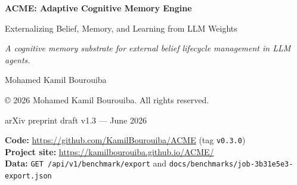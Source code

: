 \documentclass[11pt,a4paper]{article}
\newcommand{\papertagline}{A cognitive memory substrate for external belief lifecycle management in LLM agents.}
\begin{document}



\begin{center}
  \vspace*{0.12in}
  {\sffamily\fontsize{24}{29}\selectfont\bfseries
   ACME: Adaptive Cognitive Memory Engine\par}
  \vspace{0.85em}
  {\sffamily\Large
   Externalizing Belief, Memory, and Learning from LLM Weights\par}
  \vspace{1.1em}
  {\normalsize\itshape\papertagline\par}
  \vspace{1.15em}
  {\normalsize Mohamed Kamil Bourouiba\par}
  \vspace{0.35em}
  {\footnotesize\copyright{} 2026 Mohamed Kamil Bourouiba. All rights reserved.\par}
  \vspace{0.45em}
  {\small arXiv preprint draft v1.3 --- June 2026\par}
  \vspace{0.85em}
  \acmeTitleStrip
  \vspace{0.65em}
  \begin{metabox}
    \begin{minipage}{0.88\linewidth}
      \footnotesize\sffamily\color{acmefiggray}
      \textbf{Code:} \url{https://github.com/KamilBourouiba/ACME} (tag \texttt{v0.3.0})\\
      \textbf{Project site:} \url{https://kamilbourouiba.github.io/ACME/}\\
      \textbf{Data:} \texttt{GET /api/v1/benchmark/export} and \texttt{docs/benchmarks/job-3b31e5e3-export.json}
    \end{minipage}
  \end{metabox}
  \vspace{0.75em}
\end{center}
\end{document}
